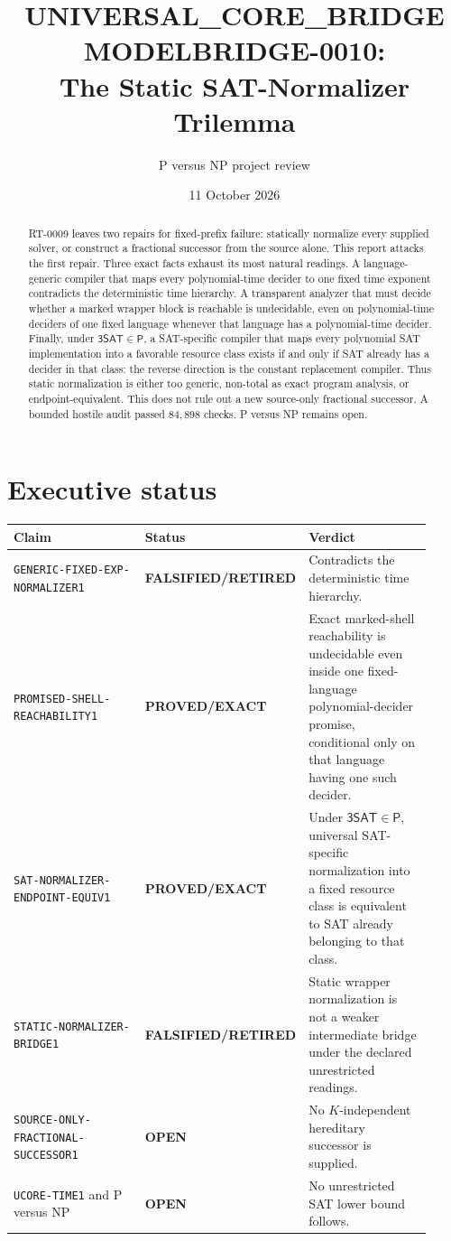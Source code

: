 \documentclass[11pt]{article}
\title{UNIVERSAL\_CORE\_BRIDGE MODELBRIDGE-0010:\\
The Static SAT-Normalizer Trilemma}
\author{P versus NP project review}
\date{11 October 2026}
\newcommand{\SAT}{\mathsf{3SAT}}
\newcommand{\EXACT}{\textbf{PROVED/EXACT}}
\newcommand{\OPEN}{\textbf{OPEN}}
\newcommand{\RETIRED}{\textbf{FALSIFIED/RETIRED}}
\begin{document}
\maketitle

\begin{abstract}
RT-0009 leaves two repairs for fixed-prefix failure: statically normalize every
supplied solver, or construct a fractional successor from the source alone.
This report attacks the first repair.  Three exact facts exhaust its most
natural readings.  A language-generic compiler that maps every polynomial-time
decider to one fixed time exponent contradicts the deterministic time
hierarchy.  A transparent analyzer that must decide whether a marked wrapper
block is reachable is undecidable, even on polynomial-time deciders of one
fixed language whenever that language has a polynomial-time decider.  Finally,
under $\SAT\in\mathsf P$, a SAT-specific compiler that maps every polynomial
SAT implementation into a favorable resource class exists if and only if SAT
already has a decider in that class: the reverse direction is the constant
replacement compiler.  Thus static normalization is either too generic,
non-total as exact program analysis, or endpoint-equivalent.  This does not
rule out a new source-only fractional successor.  A bounded hostile audit
passed $84{,}898$ checks.  P versus NP remains open.
\end{abstract}

\section{Executive status}

\begin{center}
\small
\begin{tabular}{p{0.37\linewidth}p{0.20\linewidth}p{0.35\linewidth}}
\toprule
Claim & Status & Verdict\\
\midrule
\texttt{GENERIC-FIXED-EXP-NORMALIZER1} & \RETIRED &
Contradicts the deterministic time hierarchy.\\
\texttt{PROMISED-SHELL-REACHABILITY1} & \EXACT &
Exact marked-shell reachability is undecidable even inside one fixed-language
polynomial-decider promise, conditional only on that language having one such
decider.\\
\texttt{SAT-NORMALIZER-ENDPOINT-EQUIV1} & \EXACT &
Under $\SAT\in\mathsf P$, universal SAT-specific normalization into a fixed
resource class is equivalent to SAT already belonging to that class.\\
\texttt{STATIC-NORMALIZER-BRIDGE1} & \RETIRED &
Static wrapper normalization is not a weaker intermediate bridge under the
declared unrestricted readings.\\
\texttt{SOURCE-ONLY-FRACTIONAL-SUCCESSOR1} & \OPEN &
No $K$-independent hereditary successor is supplied.\\
\texttt{UCORE-TIME1} and P versus NP & \OPEN &
No unrestricted SAT lower bound follows.\\
\bottomrule
\end{tabular}
\end{center}
\end{document}
